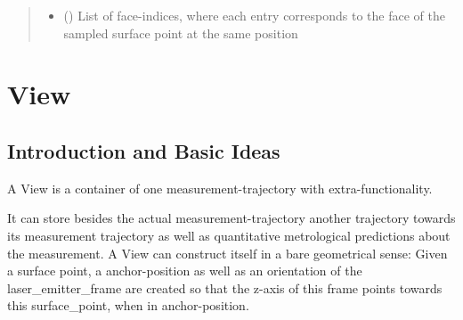 \documentclass[letterpaper,10pt,english]{sphinxmanual}
\begin{document}
\begin{fulllineitems}
\begin{fulllineitems}
\begin{quote}
\begin{description}
\begin{itemize}
\item {} 
 (\sphinxstyleliteralemphasis{{[}}\sphinxstyleliteralemphasis{{]}}) \textendash{} List of face-indices, where each entry corresponds to the face of the sampled surface point at the same position

\end{itemize}

\end{description}\end{quote}

\end{fulllineitems}


\end{fulllineitems}



\chapter{View}
\label{\detokenize{module_view:id1}}\label{\detokenize{module_view::doc}}\label{\detokenize{module_view:view}}

\section{Introduction and Basic Ideas}
\label{\detokenize{module_view:introduction-and-basic-ideas}}
A View is a container of one measurement-trajectory with extra-functionality.

It can store besides the actual measurement-trajectory another trajectory towards its
measurement trajectory as well as quantitative metrological predictions about the measurement. A View can construct itself in a bare geometrical sense: Given a surface point,
a anchor-position as well as an orientation of the laser\_emitter\_frame are created so that the z-axis of this frame points towards this surface\_point, when in anchor-position.
\end{document}
